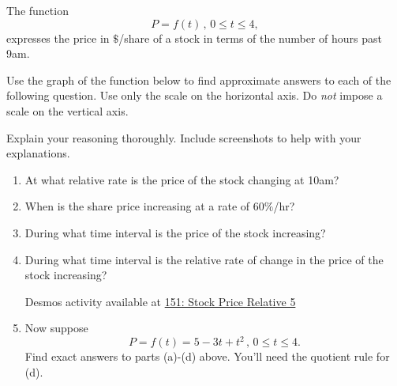 \documentclass{ximera}
\begin{document}
\begin{question} \label{Qhh43tbbt3t}
The function 
\[
      P = f(t) \, , \, 0\leq t \leq 4 , 
\]
expresses the price in $\$$/share of a stock in terms of the number of hours past 9am. 

Use the graph of the function below to find approximate answers to each of the following question. Use only the scale on the horizontal axis. Do \emph{not} impose a scale on the vertical axis.

Explain your reasoning thoroughly. Include screenshots to help with your explanations.

\begin{enumerate}
\item At what relative rate is the price of the stock changing at 10am? 

\item When is the share price increasing at a rate of $60\%$/hr?

\item During what time interval is the price of the stock increasing?

\item During what time interval is the relative rate of change in the price of the stock increasing? 

\begin{onlineOnly}
    \begin{center}
\end{center}
\end{onlineOnly}

Desmos activity available at \href{https://www.desmos.com/calculator/147urxpi6y}{151: Stock Price Relative 5}

\item Now suppose
\[
      P = f(t) = 5 -3t + t^2 \, , \, 0\leq t \leq 4 . 
\]
Find exact answers to parts (a)-(d) above. You'll need the quotient rule for (d).

\end{enumerate}
\end{question}
\end{document}
